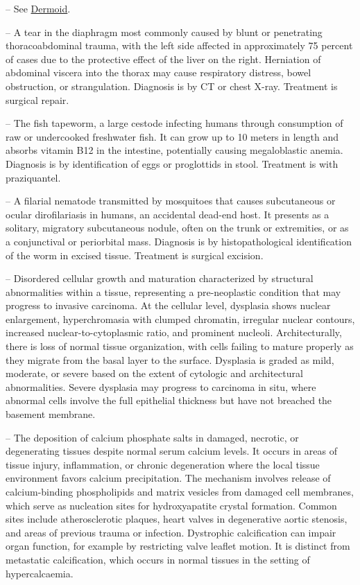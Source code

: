 -- See \hyperlink{Dermoid}{Dermoid}.

-- A tear in the diaphragm most commonly caused by blunt or penetrating thoracoabdominal trauma, with the left side affected in approximately 75 percent of cases due to the protective effect of the liver on the right. Herniation of abdominal viscera into the thorax may cause respiratory distress, bowel obstruction, or strangulation. Diagnosis is by CT or chest X-ray. Treatment is surgical repair.

-- The fish tapeworm, a large cestode infecting humans through consumption of raw or undercooked freshwater fish. It can grow up to 10 meters in length and absorbs vitamin B12 in the intestine, potentially causing megaloblastic anemia. Diagnosis is by identification of eggs or proglottids in stool. Treatment is with praziquantel.

-- A filarial nematode transmitted by mosquitoes that causes subcutaneous or ocular dirofilariasis in humans, an accidental dead-end host. It presents as a solitary, migratory subcutaneous nodule, often on the trunk or extremities, or as a conjunctival or periorbital mass. Diagnosis is by histopathological identification of the worm in excised tissue. Treatment is surgical excision.

-- Disordered cellular growth and maturation characterized by structural abnormalities within a tissue, representing a pre-neoplastic condition that may progress to invasive carcinoma. At the cellular level, dysplasia shows nuclear enlargement, hyperchromasia with clumped chromatin, irregular nuclear contours, increased nuclear-to-cytoplasmic ratio, and prominent nucleoli. Architecturally, there is loss of normal tissue organization, with cells failing to mature properly as they migrate from the basal layer to the surface. Dysplasia is graded as mild, moderate, or severe based on the extent of cytologic and architectural abnormalities. Severe dysplasia may progress to carcinoma in situ, where abnormal cells involve the full epithelial thickness but have not breached the basement membrane.

-- The deposition of calcium phosphate salts in damaged, necrotic, or degenerating tissues despite normal serum calcium levels. It occurs in areas of tissue injury, inflammation, or chronic degeneration where the local tissue environment favors calcium precipitation. The mechanism involves release of calcium-binding phospholipids and matrix vesicles from damaged cell membranes, which serve as nucleation sites for hydroxyapatite crystal formation. Common sites include atherosclerotic plaques, heart valves in degenerative aortic stenosis, and areas of previous trauma or infection. Dystrophic calcification can impair organ function, for example by restricting valve leaflet motion. It is distinct from metastatic calcification, which occurs in normal tissues in the setting of hypercalcaemia.

